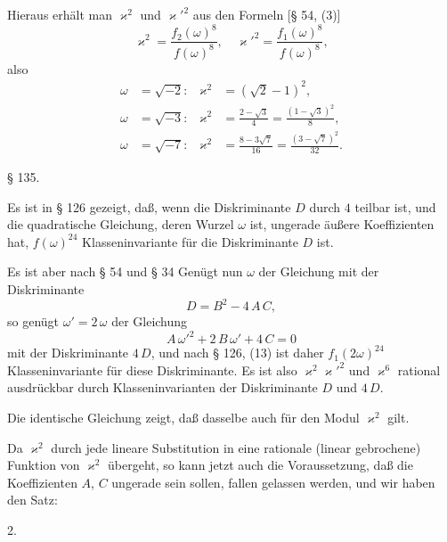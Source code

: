 
Hieraus erhält man $\varkappa^2$ und $\varkappa'^2$ aus den Formeln [§ 54, (3)]
\[
\varkappa^2 = \frac{f_2(\omega)^8}{f(\omega)^8}, \quad \varkappa'^2 = \frac{f_1(\omega)^8}{f(\omega)^8},
\]
also
\[
\begin{aligned}
\omega &= \sqrt{-2}\colon & \varkappa^2 &= (\sqrt{2} - 1)^2, \\
\omega &= \sqrt{-3}\colon & \varkappa^2 &= \frac{2 - \sqrt{3}}{4} = \frac{(1 - \sqrt{3})^2}{8}, \\
\omega &= \sqrt{-7}\colon & \varkappa^2 &= \frac{8 - 3\sqrt{7}}{16} = \frac{(3 - \sqrt{7})^2}{32}.
\end{aligned}
\]

\begin{center}
§ 135.\qquad {}
\end{center}

Es ist in § 126 gezeigt, daß, wenn die Diskriminante $D$ durch
$4$ teilbar ist, und die quadratische Gleichung, deren Wurzel $\omega$
ist, ungerade äußere Koeffizienten hat, $f(\omega)^{24}$ Klasseninvariante
für die Diskriminante $D$ ist.

Es ist aber nach § 54 und § 34
Genügt nun $\omega$ der Gleichung
mit der Diskriminante
\[
D = B^2 - 4\,A\,C,
\]
so genügt $\omega' = 2\,\omega$ der Gleichung
\[
A\,\omega'^2 + 2\,B\,\omega' + 4\,C = 0
\]
mit der Diskriminante $4\,D$, und nach § 126, (13) ist daher
$f_1(2\omega)^{24}$ Klasseninvariante für diese Diskriminante. Es ist also
$\varkappa^2 \varkappa'^2$ und $\varkappa^6$ rational ausdrückbar durch Klasseninvarianten der
Diskriminante $D$ und $4\,D$.

Die identische Gleichung
zeigt, daß dasselbe auch für den Modul $\varkappa^2$ gilt.

Da $\varkappa^2$ durch jede lineare Substitution in eine rationale
(linear gebrochene) Funktion von $\varkappa^2$ übergeht, so kann jetzt auch
die Voraussetzung, daß die Koeffizienten $A$, $C$ ungerade sein
sollen, fallen gelassen werden, und wir haben den Satz:

2. 
